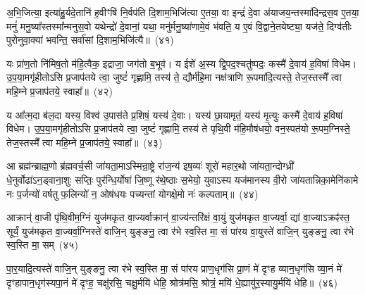 अ॒भि॒जित्या॒ इत्या॑हु॒र्यदे॒तानि॑ ह॒वीꣳषि॑ नि॒र्वप॑ति दि॒शाम॒भिजि॑त्या ए॒तया॒ वा इन्द्रं॑ दे॒वा अ॑याजय॒न्तस्मा॑दिन्द्रस॒व ए॒तया॒ मनुं॑ मनु॒ष्या᳚स्तस्मा᳚न्मनुस॒वो यथेन्द्रो॑ दे॒वानां॒ यथा॒ मनु॑र्मनु॒ष्या॑णामे॒वं भ॑वति॒ य ए॒वं वि॒द्वाने॒तयेष्ट्या॒ यज॑ते॒ दिग्व॑तीः पुरोनुवा॒क्या॑ भवन्ति॒ सर्वा॑सां दि॒शाम॒भिजि॑त्यै॥~(४१)\ip

{\anuvakamend[{अशा᳚न्तः सुषुवा॒णेनैक॑चत्वारिꣳशच्च}]}%

यः प्रा॑ण॒तो नि॑मिष॒तो म॑हि॒त्वैक॒ इद्राजा॒ जग॑तो ब॒भूव॑। य ईशे॑ अ॒स्य द्वि॒पद॒श्चतु॑ष्पदः॒ कस्मै॑ दे॒वाय॑ ह॒विषा॑ विधेम। उ॒प॒या॒मगृ॑हीतो\-ऽसि प्र॒जा\-प॑तये त्वा॒ जुष्टं॑ गृह्णामि॒ तस्य॑ ते॒ द्यौर्म॑हि॒मा नक्ष॑त्राणि रू॒पमा॑दि॒त्यस्ते॒ तेज॒स्तस्मै᳚ त्वा महि॒म्ने प्र॒जा\-प॑तये॒ स्वाहा᳚॥~(४२)\ip

{\anuvakamend[{यः प्रा॑ण॒तो द्यौरा॑दि॒त्यो᳚\-ऽष्टात्रिꣳ॑शत्}]}%

य आ᳚त्म॒दा ब॑ल॒दा यस्य॒ विश्व॑ उ॒पास॑ते प्र॒शिषं॒ यस्य॑ दे॒वाः। यस्य॑ छा॒यामृतं॒ यस्य॑ मृ॒त्युः कस्मै॑ दे॒वाय॑ ह॒विषा॑ विधेम। उ॒प॒या॒मगृ॑हीतो\-ऽसि प्र॒जा\-प॑तये त्वा॒ जुष्टं॑ गृह्णामि॒ तस्य॑ ते पृथि॒वी म॑हि॒मौष॑धयो॒ वन॒स्पत॑यो रू॒पम॒ग्निस्ते॒ तेज॒स्तस्मै᳚ त्वा महि॒म्ने प्र॒जा\-प॑तये॒ स्वाहा᳚॥~(४३)\ip

{\anuvakamend[{य आ᳚त्म॒दाः पृ॑थि॒व्य॑ग्निरेका॒न्नच॑त्वारि॒ꣳ॒शत्}]}%

आ ब्रह्म॑न्ब्राह्म॒णो ब्र॑ह्मवर्च॒सी जा॑यता॒मा\-ऽस्मिन्रा॒ष्ट्रे रा॑ज॒न्य॑ इष॒व्यः॑ शूरो॑ महार॒थो जा॑यता॒न्दोग्ध्री॑ धे॒नुर्वोढा॑\-ऽ\-न॒ड्वाना॒शुः सप्तिः॒ पुर॑न्धि॒र्योषा॑ जि॒ष्णू र॑थे॒ष्ठाः स॒भेयो॒ युवा\-ऽस्य यज॑मानस्य वी॒रो जा॑यतान्निका॒मेनि॑कामे नः प॒र्जन्यो॑ वर्\mbox{}षतु फ॒लिन्यो॑ न॒ ओष॑धयः पच्यन्तां योगक्षे॒मो नः॑ कल्पताम्॥~(४४)\ip

{\anuvakamend[{आ ब्रह्म॒न्नेक॑चत्वारिꣳशत्}]}%

आक्रान्॑ वा॒जी पृ॑थि॒वीम॒ग्निं युज॑मकृत वा॒ज्यर्वाक्रान्॑ वा॒ज्य॑न्तरि॑क्षं वा॒युं युज॑मकृत वा॒ज्यर्वा॒ द्यां वा॒ज्या\-ऽक्रꣴ॑स्त॒ सूर्यं॒ युज॑मकृत वा॒ज्यर्वा॒ग्निस्ते॑ वाजि॒न् युङ्ङनु॒ त्वा र॑भे स्व॒स्ति मा॒ सं पा॑रय वा॒युस्ते॑ वाजि॒न् युङ्ङनु॒ त्वा र॑भे स्व॒स्ति मा॒ सम्~(४५)\ip

पा॒र॒यादि॒त्यस्ते॑ वाजि॒न् युङ्ङनु॒ त्वा र॑भे स्व॒स्ति मा॒ सं पा॑रय प्राण॒धृग॑सि प्रा॒णं मे॑ दृꣳह व्यान॒धृग॑सि व्या॒नं मे॑ दृꣳहापान॒धृग॑स्यपा॒नं मे॑ दृꣳह॒ चक्षु॑रसि॒ चक्षु॒र्मयि॑ धेहि॒ श्रोत्र॑मसि॒ श्रोत्रं॒ मयि॑ धे॒ह्यायु॑र॒स्यायु॒र्मयि॑ धेहि॥~(४६)\ip

{\anuvakamend[{वा॒युस्ते॑ वाजि॒न् युङ्ङनु॒ त्वा र॑भे स्व॒स्ति मा॒ सन्त्रिच॑त्वारिꣳशच्च}]}%

